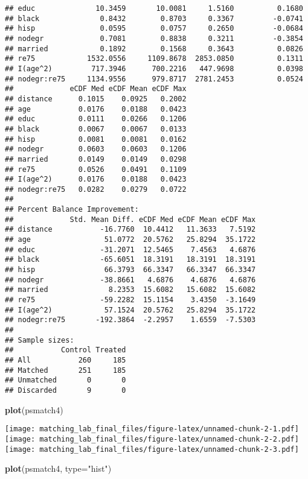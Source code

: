 \documentclass[]{article}
\newenvironment{Shaded}{\begin{snugshade}}{\end{snugshade}}
\newcommand{\DataTypeTok}[1]{\textcolor[rgb]{0.13,0.29,0.53}{#1}}
\newcommand{\KeywordTok}[1]{\textcolor[rgb]{0.13,0.29,0.53}{\textbf{#1}}}
\newcommand{\NormalTok}[1]{#1}
\newcommand{\StringTok}[1]{\textcolor[rgb]{0.31,0.60,0.02}{#1}}
\begin{document}
\begin{verbatim}
## educ              10.3459       10.0081     1.5160          0.1680
## black              0.8432        0.8703     0.3367         -0.0741
## hisp               0.0595        0.0757     0.2650         -0.0684
## nodegr             0.7081        0.8838     0.3211         -0.3854
## married            0.1892        0.1568     0.3643          0.0826
## re75            1532.0556     1109.8678  2853.0850          0.1311
## I(age^2)         717.3946      700.2216   447.9698          0.0398
## nodegr:re75     1134.9556      979.8717  2781.2453          0.0524
##             eCDF Med eCDF Mean eCDF Max
## distance      0.1015    0.0925   0.2002
## age           0.0176    0.0188   0.0423
## educ          0.0111    0.0266   0.1206
## black         0.0067    0.0067   0.0133
## hisp          0.0081    0.0081   0.0162
## nodegr        0.0603    0.0603   0.1206
## married       0.0149    0.0149   0.0298
## re75          0.0526    0.0491   0.1109
## I(age^2)      0.0176    0.0188   0.0423
## nodegr:re75   0.0282    0.0279   0.0722
## 
## Percent Balance Improvement:
##             Std. Mean Diff. eCDF Med eCDF Mean eCDF Max
## distance           -16.7760  10.4412   11.3633   7.5192
## age                 51.0772  20.5762   25.8294  35.1722
## educ               -31.2071  12.5465    7.4563   4.6876
## black              -65.6051  18.3191   18.3191  18.3191
## hisp                66.3793  66.3347   66.3347  66.3347
## nodegr             -38.8661   4.6876    4.6876   4.6876
## married              8.2353  15.6082   15.6082  15.6082
## re75               -59.2282  15.1154    3.4350  -3.1649
## I(age^2)            57.1524  20.5762   25.8294  35.1722
## nodegr:re75       -192.3864  -2.2957    1.6559  -7.5303
## 
## Sample sizes:
##           Control Treated
## All           260     185
## Matched       251     185
## Unmatched       0       0
## Discarded       9       0
\end{verbatim}

\begin{Shaded}
\begin{Highlighting}[]
\KeywordTok{plot}\NormalTok{(psmatch4)}
\end{Highlighting}
\end{Shaded}

\texttt{[image: matching\_lab\_final\_files/figure-latex/unnamed-chunk-2-1.pdf]}
\texttt{[image: matching\_lab\_final\_files/figure-latex/unnamed-chunk-2-2.pdf]}
\texttt{[image: matching\_lab\_final\_files/figure-latex/unnamed-chunk-2-3.pdf]}

\begin{Shaded}
\begin{Highlighting}[]
\KeywordTok{plot}\NormalTok{(psmatch4, }\DataTypeTok{type=}\StringTok{"hist"}\NormalTok{)}
\end{Highlighting}
\end{Shaded}
\end{document}
